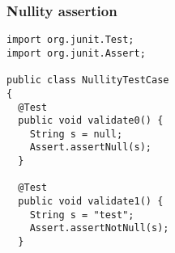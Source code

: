 \begin{frame}[fragile, hasprev=false, hasnext=false]
\frametitle{Nullity assertion}
\label{example:junit-nullity-assertion}

\begin{lstlisting}
import org.junit.Test;
import org.junit.Assert;

public class NullityTestCase
{
  @Test
  public void validate0() {
    String s = null;
    Assert.assertNull(s);
  }

  @Test
  public void validate1() {
    String s = "test";
    Assert.assertNotNull(s);
  }
\end{lstlisting}
\end{frame}